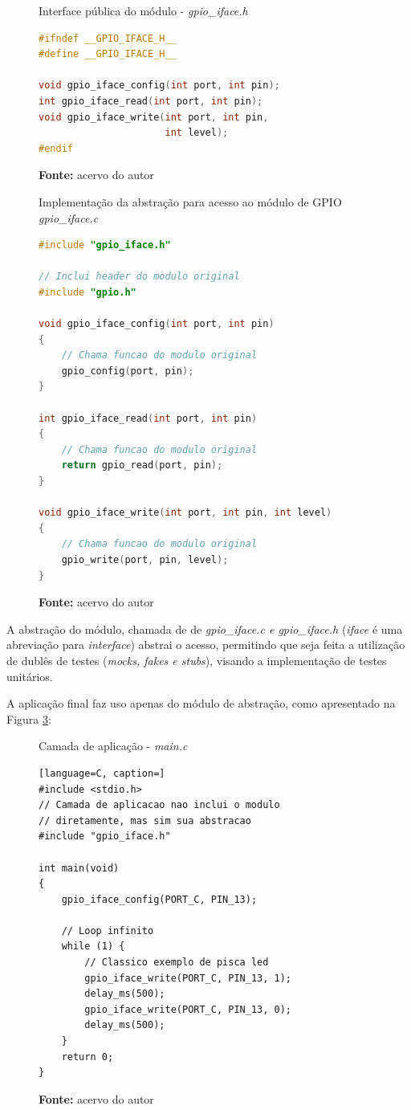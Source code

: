 \documentclass[times, twoside, watermark]{artigo}
\begin{document}
\begin{figure}[H]
  \centering
  \caption{Interface pública do módulo - \textit{gpio\_iface.h}}
\begin{lstlisting}[language=C]
#ifndef __GPIO_IFACE_H__
#define __GPIO_IFACE_H__

void gpio_iface_config(int port, int pin);
int gpio_iface_read(int port, int pin);
void gpio_iface_write(int port, int pin,
                      int level);
#endif
\end{lstlisting}
  \label{fig:gpio_iface.h}
  \caption*{\newline\textbf{Fonte:} acervo do autor}
\end{figure}

\begin{figure}[H]
  \centering
  \caption{Implementação da abstração para acesso ao módulo de GPIO
\textit{gpio\_iface.c}}
\begin{lstlisting}[language=C]
#include "gpio_iface.h"

// Inclui header do modulo original
#include "gpio.h"

void gpio_iface_config(int port, int pin)
{
    // Chama funcao do modulo original
    gpio_config(port, pin);
}

int gpio_iface_read(int port, int pin)
{
    // Chama funcao do modulo original
    return gpio_read(port, pin);
}

void gpio_iface_write(int port, int pin, int level)
{
    // Chama funcao do modulo original
    gpio_write(port, pin, level);
}
\end{lstlisting}
  \label{fig:gpio_iface.c}
  \caption*{\newline\textbf{Fonte:} acervo do autor}
\end{figure}

A abstração do módulo, chamada de de \textit{gpio\_iface.c e gpio\_iface.h}
(\textit{iface} é uma abreviação para \textit{interface}) abstrai o
acesso, permitindo que seja feita a utilização de dublês de testes (\textit{mocks,
  fakes e stubs}), visando a implementação de testes unitários.

A aplicação final faz uso apenas do módulo de abstração, como apresentado na Figura 
\ref{fig:main.c}:\hfill\\

\begin{figure}[H]
  \centering
  \caption{Camada de aplicação - \textit{main.c}}
\begin{lstlisting}[language=C, caption=]
#include <stdio.h>
// Camada de aplicacao nao inclui o modulo
// diretamente, mas sim sua abstracao
#include "gpio_iface.h"

int main(void)
{
    gpio_iface_config(PORT_C, PIN_13);
    
    // Loop infinito
    while (1) {
        // Classico exemplo de pisca led
        gpio_iface_write(PORT_C, PIN_13, 1);
        delay_ms(500);
        gpio_iface_write(PORT_C, PIN_13, 0);
        delay_ms(500);
    }
    return 0;
}
\end{lstlisting}
  \label{fig:main.c}
  \caption*{\newline\textbf{Fonte:} acervo do autor}
\end{figure}
\end{document}

